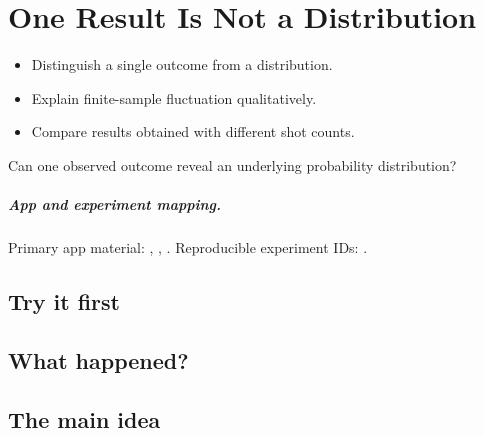 \chapter[One Result and a Distribution]{One Result Is Not a Distribution}
\label{chap:one-result-is-not-a-distribution}

\begin{learningobjectives}
\begin{itemize}
  \item Distinguish a single outcome from a distribution.
  \item Explain finite-sample fluctuation qualitatively.
  \item Compare results obtained with different shot counts.
\end{itemize}
\end{learningobjectives}

\begin{openingquestion}
Can one observed outcome reveal an underlying probability distribution?
\end{openingquestion}

\paragraph{App and experiment mapping.}
Primary app material: , , . Reproducible experiment IDs:
.

\section{Try it first}
\begin{tryit}
\end{tryit}

\section{What happened?}

\section{The main idea}
\begin{coreidea}
\end{coreidea}

